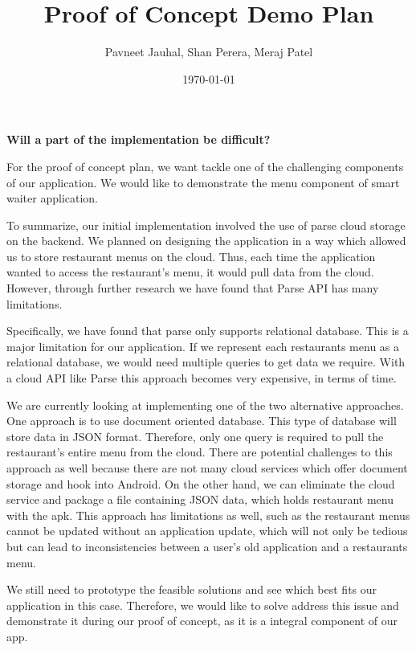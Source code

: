 \documentclass[12pt]{article}
\begin{document}
\title{Proof of Concept Demo Plan} 
\author{Pavneet Jauhal, Shan Perera, Meraj Patel}
\date{\today}

\maketitle

\textbf{Will a part of the implementation be difficult?}

For the proof of concept plan, we want tackle one of the challenging components of our application. We would like to demonstrate the menu component of smart waiter application. 

To summarize, our initial implementation involved the use of parse cloud storage on the backend. We planned on designing the application in a way which allowed us to store restaurant menus on the cloud. Thus, each time the application wanted to access the restaurant’s menu, it would pull data from the cloud. However, through further research we have found that Parse API has many limitations. 

Specifically, we have found that parse only supports relational database. This is a major limitation for our application. If we represent each restaurants menu as a relational database, we would need multiple queries to get data we require.  With a cloud API like Parse this approach becomes very expensive, in terms of time. 

We are currently looking at implementing one of the two alternative approaches. One approach is to use document oriented database. This type of database will store data in JSON format. Therefore, only one query is required to pull the restaurant’s entire menu from the cloud. There are potential challenges to this approach as well because there are not many cloud services which offer document storage and hook into Android.  On the other hand, we can eliminate the cloud service and package a file containing JSON data, which holds restaurant menu with the apk. This approach has limitations as well, such as the restaurant menus cannot be updated without an application update, which will not only be tedious but can lead to inconsistencies between a user's old application and a restaurants menu. 

We still need to prototype the feasible solutions and see which best fits our application in this case. Therefore, we would like to solve address this issue and demonstrate it during our proof of concept, as it is a integral component of our app.
\end{document}
